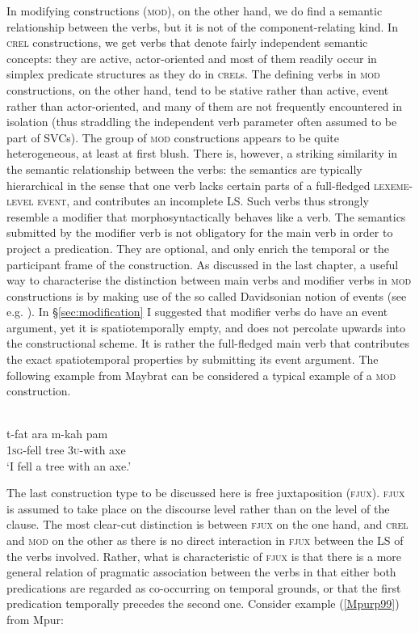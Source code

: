 In modifying constructions (\textsc{mod}), on the other hand, we do find a semantic relationship between the verbs, but it is not of the component-relating kind. In \textsc{crel} constructions, we get verbs that denote fairly independent semantic concepts: they are active, actor-oriented and most of them readily occur in simplex predicate structures as they do in \textsc{crel}s. The defining verbs in \textsc{mod} constructions, on the other hand, tend to be stative rather than active, event rather than actor-oriented, and many of them are not frequently encountered in isolation (thus straddling the independent verb parameter often assumed to be part of SVCs). The group of \textsc{mod} constructions appears to be quite heterogeneous, at least at first blush. There is, however, a striking similarity in the semantic relationship between the verbs: the semantics are typically hierarchical in the sense that one verb lacks certain parts of a full-fledged \textsc{lexeme-level event}, and contributes an incomplete LS. Such verbs thus strongly resemble a modifier that morphosyntactically behaves like a verb. The semantics submitted by the modifier verb is not obligatory for the main verb in order to project a predication. They are optional, and only enrich the temporal or the participant frame of the construction. As discussed in the last chapter, a useful way to characterise the distinction between main verbs and modifier verbs in \textsc{mod} constructions is by making use of the so called Davidsonian notion of events (see e.g. \citealt{maienborn2011event}). In §\ref{sec:modification} I suggested that modifier verbs do have an event argument, yet it is spatiotemporally empty, and does not percolate upwards into the constructional scheme. It is rather the full-fledged main verb that contributes the exact spatiotemporal properties by submitting its event argument. The following example from Maybrat can be considered a typical example of a \textsc{mod} construction. 

\ea \label{}
\\
\gll t-fat ara m-kah pam \\
1\textsc{sg}-fell tree 3\textsc{u}-with axe \\
\glft `I fell a tree with an axe.'\\ 
\z

The last construction type to be discussed here is free juxtaposition (\textsc{fjux}). \textsc{fjux} is assumed to take place on the discourse level rather than on the level of the clause. The most clear-cut distinction is between \textsc{fjux} on the one hand, and \textsc{crel} and \textsc{mod} on the other as there is no direct interaction in \textsc{fjux} between the LS of the verbs involved. Rather, what is characteristic of \textsc{fjux} is that there is a more general relation of pragmatic association between the verbs in that either both predications are regarded as co-occurring on temporal grounds, or that the first predication temporally precedes the second one. Consider example (\ref{Mpurp99}) from Mpur:

